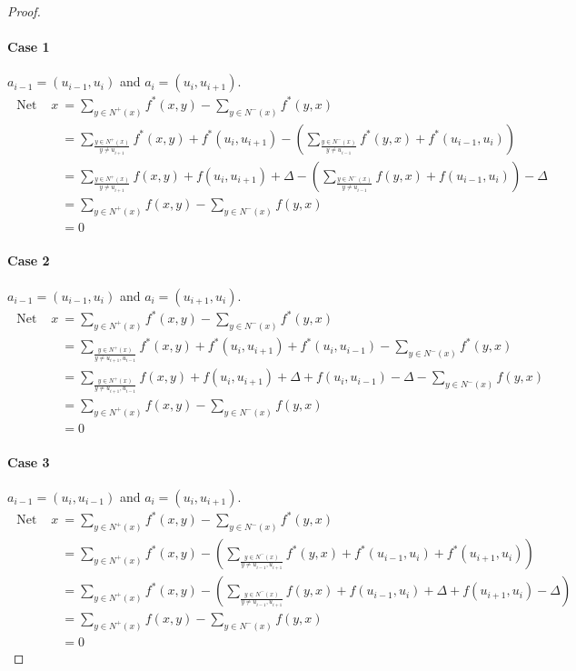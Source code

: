 \begin{proof}
	\paragraph{Case 1} $a_{i-1} = (u_{i-1},u_i)$ and $a_i = (u_i, u_{i+1})$.
	\begin{align*}
		\text{ Net flow out of } x
		& = \sum_{y \in N^+(x)} f^*(x,y) - \sum_{y \in N^-(x)} f^*(y,x)\\
		& = \sum_{\frac{y \in N^+(x)}{y \ne u_{i+1}}} f^*(x,y) + f^*(u_i,u_{i+1}) - \left( \sum_{\frac{y \in N^-(x)}{y \ne u_{i-1}}} f^*(y,x) + f^*(u_{i-1},u_i) \right)\\
		& = \sum_{\frac{y \in N^+(x)}{y \ne u_{i+1}}} f(x,y) + f(u_i,u_{i+1}) + \Delta - \left( \sum_{\frac{y \in N^-(x)}{y \ne u_{i-1}}} f(y,x) + f(u_{i-1},u_i) \right) - \Delta \\
		& = \sum_{y \in N^+(x)} f(x,y) - \sum_{y \in N^-(x)} f(y,x) \\
		& = 0
	\end{align*}

	\paragraph{Case 2} $a_{i-1} = (u_{i-1},u_i)$ and $a_i = (u_{i+1},u_i)$.
	\begin{align*}
		\text{ Net flow out of } x
		& = \sum_{y \in N^+(x)} f^*(x,y) - \sum_{y \in N^-(x)} f^*(y,x) \\
		& = \sum_{\frac{y \in N^+(x)}{y \ne u_{i+1}, u_{i-1}}} f^*(x,y) + f^*(u_i,u_{i+1}) + f^*(u_i,u_{i-1}) - \sum_{y \in N^-(x)} f^*(y,x) \\
		& = \sum_{\frac{y \in N^+(x)}{y \ne u_{i+1}, u_{i-1}}} f(x,y) + f(u_i,u_{i+1}) + \Delta + f(u_i,u_{i-1}) - \Delta - \sum_{y \in N^-(x)} f(y,x) \\
		& = \sum_{y \in N^+(x)} f(x,y) - \sum_{y \in N^-(x)} f(y,x) \\
		& = 0
	\end{align*}

	\paragraph{Case 3} $a_{i-1} = (u_i, u_{i-1})$ and $a_i = (u_i,u_{i+1})$.
	\begin{align*}
		\text{ Net flow out of } x
		& = \sum_{y \in N^+(x)} f^*(x,y) - \sum_{y \in N^-(x)} f^*(y,x) \\
		& = \sum_{y \in N^+(x)} f^*(x,y) - \left( \sum_{\frac{y \in N^-(x)}{y \ne u_{i-1}, u_{i+1}}} f^*(y,x) + f^*(u_{i-1},u_i) + f^*(u_{i+1},u_i) \right)\\
		& = \sum_{y \in N^+(x)} f^*(x,y) - \left( \sum_{\frac{y \in N^-(x)}{y \ne u_{i-1}, u_{i+1}}} f(y,x) + f(u_{i-1},u_i) + \Delta + f(u_{i+1},u_i) - \Delta \right)\\
		& = \sum_{y \in N^+(x)} f(x,y) - \sum_{y \in N^-(x)} f(y,x) \\
		& = 0
	\end{align*}


\end{proof}
